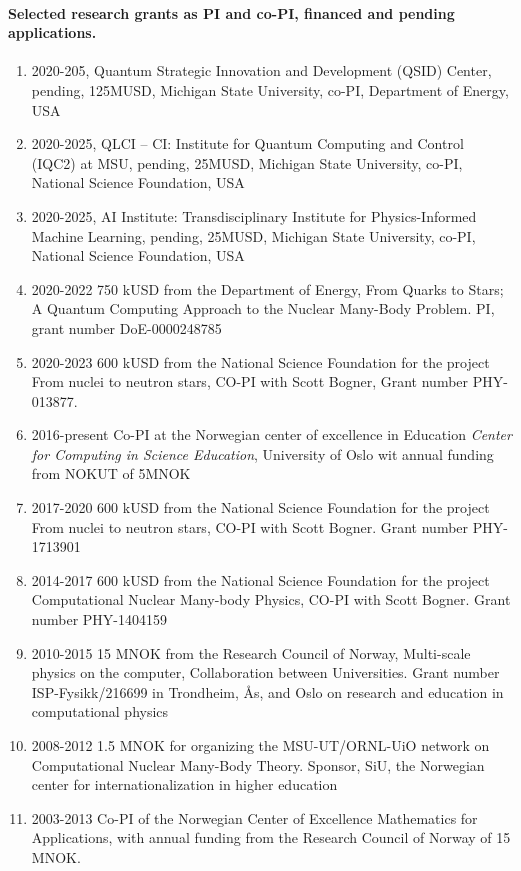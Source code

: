 \documentclass[%
oneside,                 %
final,                   %
10pt]{article}
\begin{document}
\paragraph{Selected research grants as PI and co-PI, financed and pending applications.}
\begin{enumerate}
\item 2020-205, Quantum Strategic Innovation and Development (QSID) Center, pending, 125MUSD, Michigan State University, co-PI, Department of Energy, USA

\item 2020-2025, QLCI – CI: Institute for Quantum Computing and Control (IQC2) at MSU, pending, 25MUSD, Michigan State University, co-PI, National Science Foundation, USA

\item 2020-2025, AI Institute:  Transdisciplinary Institute for Physics-Informed Machine Learning, pending, 25MUSD, Michigan State University, co-PI, National Science Foundation, USA

\item 2020-2022 750 kUSD from the Department of Energy, From Quarks to Stars; A Quantum Computing Approach to the Nuclear Many-Body Problem. PI, grant number DoE-0000248785  

\item 2020-2023 600 kUSD from the National Science Foundation for the project From nuclei to neutron stars, CO-PI with Scott Bogner, Grant number PHY-013877. 

\item 2016-present Co-PI  at the Norwegian center of excellence in Education \emph{Center for Computing in Science Education}, University of Oslo wit annual funding from NOKUT of 5MNOK

\item 2017-2020 600 kUSD from the National Science Foundation for the project From nuclei to neutron stars, CO-PI with Scott Bogner. Grant number PHY-1713901

\item 2014-2017 600 kUSD from the National Science Foundation for the project Computational Nuclear Many-body Physics, CO-PI with Scott Bogner. Grant number PHY-1404159

\item 2010-2015 15 MNOK from the Research Council of Norway, Multi-scale physics on the computer, Collaboration between Universities. Grant number ISP-Fysikk/216699 in Trondheim, Ås, and Oslo on research and education in computational physics

\item 2008-2012 1.5 MNOK for organizing the MSU-UT/ORNL-UiO network on Computational Nuclear Many-Body Theory. Sponsor, SiU, the Norwegian center for internationalization in higher education

\item 2003-2013 Co-PI of the Norwegian Center of Excellence Mathematics for Applications, with annual funding from the Research Council of Norway of 15 MNOK.
\end{enumerate}

\noindent

\end{document}
